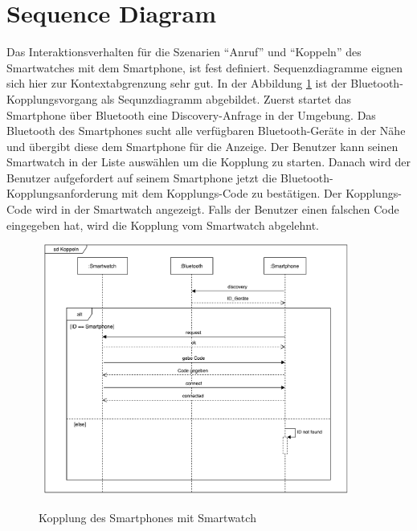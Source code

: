\section{Sequence Diagram}
Das Interaktionsverhalten für die Szenarien ``Anruf'' und ``Koppeln'' des Smartwatches mit dem Smartphone, ist fest definiert. Sequenzdiagramme eignen sich hier zur Kontextabgrenzung sehr gut.
In der Abbildung \ref{fig:kopplung} ist der Bluetooth-Kopplungsvorgang als Sequnzdiagramm abgebildet.
Zuerst startet das Smartphone über Bluetooth eine Discovery-Anfrage in der Umgebung.
Das Bluetooth des Smartphones sucht alle verfügbaren Bluetooth-Geräte in der Nähe und übergibt diese dem Smartphone für die Anzeige.
Der Benutzer kann seinen Smartwatch in der Liste auswählen um die Kopplung zu starten.
Danach wird der Benutzer aufgefordert auf seinem Smartphone jetzt die Bluetooth-Kopplungsanforderung mit dem Kopplungs-Code zu bestätigen. Der Kopplungs-Code wird in der Smartwatch angezeigt.
Falls der Benutzer einen falschen Code eingegeben hat, wird die Kopplung vom Smartwatch 
abgelehnt.

\begin{figure}[H]
\centering\
\includegraphics[width=10cm]{img/KoppelnSequenz}
\caption{Kopplung des Smartphones mit Smartwatch}\label{fig:kopplung}
\end{figure}


